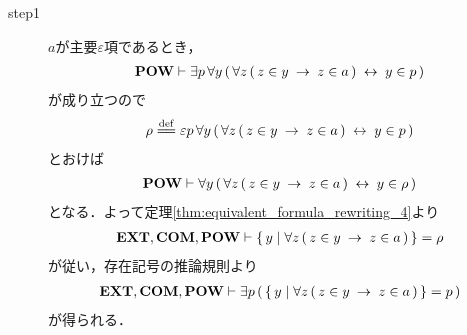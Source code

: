 	\begin{sketch}\mbox{}
		\begin{description}
			\item[step1]
				$a$が主要$\varepsilon$項であるとき，
				\begin{align}
					\mbox{{\bf POW}} \vdash \exists p\, \forall y\, (\, \forall z\, (\, z \in y \hspace{0.25em}\rightarrow\hspace{0.25em} z \in a\, ) \hspace{0.25em}\leftrightarrow\hspace{0.25em} y \in p\, )
				\end{align}
				が成り立つので
				\begin{align}
					\rho \defeq \varepsilon p\, \forall y\, (\, \forall z\, (\, z \in y \rarrow z \in a\, ) \lrarrow y \in p\, )
				\end{align}
				とおけば
				\begin{align}
					\mbox{{\bf POW}} \vdash \forall y\, (\, \forall z\, (\, z \in y \hspace{0.25em}\rightarrow\hspace{0.25em} z \in a\, ) \hspace{0.25em}\leftrightarrow\hspace{0.25em} y \in \rho\, )
					\label{fom:power_of_a_set_is_a_set_1}
				\end{align}
				となる．よって定理\ref{thm:equivalent_formula_rewriting_4}より
				\begin{align}
					\mbox{{\bf EXT}},\mbox{\bf COM},\mbox{{\bf POW}} \vdash 
					\left\{\, y \mid \forall z\, (\, z \in y \hspace{0.25em}\rightarrow\hspace{0.25em} z \in a\, )\, \right\} = \rho
				\end{align}
				が従い，存在記号の推論規則より
				\begin{align}
					\mbox{{\bf EXT}},\mbox{\bf COM},\mbox{{\bf POW}} \vdash \exists p\, 
					(\, \left\{\, y \mid \forall z\, (\, z \in y \hspace{0.25em}\rightarrow\hspace{0.25em} z \in a\, )\, \right\} = p\, )
				\end{align}
				が得られる．
				

\end{description}
\end{sketch}
